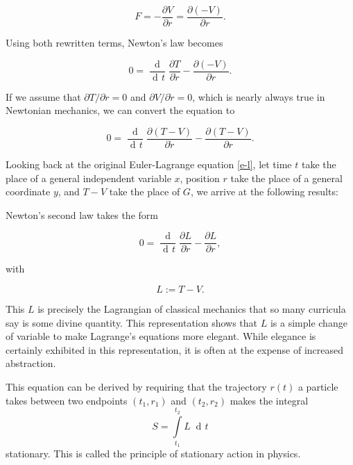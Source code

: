 \documentclass{article}
\DeclareMathOperator{\dd}{d\!}
\DeclareMathOperator{\ddd}{\mathrm{d}}
\begin{document}
\begin{equation}
F = - \frac{\partial V}{\partial r} = \frac{\partial (-V)}{\partial r}.
\end{equation}

Using both rewritten terms, Newton's law becomes


\begin{equation}
0 = \frac{\ddd}{\dd t} \frac{\partial T}{\partial \dot{r}} - \frac{\partial (-V)}{\partial r}.
\end{equation}


If we assume that $\partial T/ \partial r = 0$ and $\partial V / \partial \dot{r} = 0$, which is nearly always true in Newtonian mechanics, we can convert the equation to


\begin{equation}
0 = \frac{\ddd}{\dd t} \frac{\partial (T-V)}{\partial \dot{r}} - \frac{\partial (T-V)}{\partial r}.
\end{equation}

Looking back at the original Euler-Lagrange equation \eqref{e-l}, let time $t$ take the place of a general independent variable $x$, position $r$ take the place of a general coordinate $y$, and $T-V$ take the place of $G$, we arrive at the following results:

Newton's second law takes the form

\begin{equation}
0 = \frac{\ddd}{\dd t} \frac{\partial L}{\partial \dot{r}} - \frac{\partial L}{\partial r},
\end{equation}

with

\begin{equation}
 L := T-V.
\end{equation}

This $L$ is precisely the Lagrangian of classical mechanics that so many curricula say is some divine quantity. This representation shows that $L$ is a simple change of variable to make Lagrange's equations more elegant. While elegance is certainly exhibited in this representation, it is often at the expense of increased abstraction.


This equation can be derived by requiring that the trajectory $r(t)$ a particle takes between two endpoints $(t_1,r_1)$ and $(t_2,r_2)$ makes the integral
\begin{equation}
S=\int\limits_{t_1}^{t_2} L \; \dd t
\end{equation}
stationary. This is called the principle of stationary action in physics. \\
\end{document}
